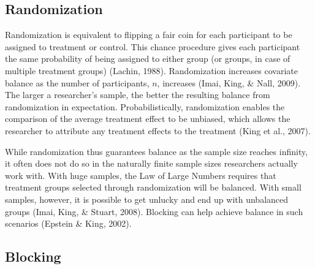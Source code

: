 \documentclass[12pt,econ]{sources/authesis}
\begin{document}
\hypertarget{ordblock-theory-randomization}{%
\subsection{Randomization}\label{ordblock-theory-randomization}}

Randomization is equivalent to flipping a fair coin for each participant to be assigned to treatment or control. This chance procedure gives each participant the same probability of being assigned to either group (or groups, in case of multiple treatment groups) (Lachin, 1988). Randomization increases covariate balance as the number of participants, \(n\), increases (Imai, King, \& Nall, 2009). The larger a researcher's sample, the better the resulting balance from randomization in expectation. Probabilistically, randomization enables the comparison of the average treatment effect to be unbiased, which allows the researcher to attribute any treatment effects to the treatment (King et al., 2007).

While randomization thus guarantees balance as the sample size reaches infinity, it often does not do so in the naturally finite sample sizes researchers actually work with. With huge samples, the Law of Large Numbers requires that treatment groups selected through randomization will be balanced. With small samples, however, it is possible to get unlucky and end up with unbalanced groups (Imai, King, \& Stuart, 2008). Blocking can help achieve balance in such scenarios (Epstein \& King, 2002).

\hypertarget{ordblock-theory-blocking}{%
\subsection{Blocking}\label{ordblock-theory-blocking}}
\end{document}
